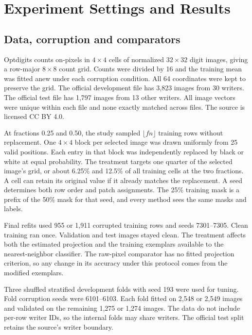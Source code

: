 \section{Experiment Settings and Results}
\subsection{Data, corruption and comparators}

Optdigits \citep{uci1998} counts on-pixels in $4\times4$ cells of normalized $32\times32$ digit images, giving a row-major $8\times8$ count grid. Counts were divided by 16 and the training mean was fitted anew under each corruption condition. All 64 coordinates were kept to preserve the grid. The official development file has 3,823 images from 30 writers. The official test file has 1,797 images from 13 other writers. All image vectors were unique within each file and none exactly matched across files. The source is licensed CC BY 4.0.


At fractions 0.25 and 0.50, the study sampled $\lfloor fn\rfloor$ training rows without replacement. One $4\times4$ block per selected image was drawn uniformly from 25 valid positions. Each entry in that block was independently replaced by black or white at equal probability. The treatment targets one quarter of the selected image's grid, or about 6.25\% and 12.5\% of all training cells at the two fractions. A cell can retain its original value if it already matches the replacement. A seed determines both row order and patch assignments. The 25\% training mask is a prefix of the 50\% mask for that seed, and every method sees the same masks and labels.

Final refits used 955 or 1,911 corrupted training rows and seeds 7301--7305. Clean training ran once. Validation and test images stayed clean. The treatment affects both the estimated projection and the training exemplars available to the nearest-neighbor classifier. The raw-pixel comparator has no fitted projection criterion, so any change in its accuracy under this protocol comes from the modified exemplars.

Three shuffled stratified development folds with seed 193 were used for tuning. Fold corruption seeds were 6101--6103. Each fold fitted on 2,548 or 2,549 images and validated on the remaining 1,275 or 1,274 images. The data do not include per-row writer IDs, so the internal folds may share writers. The official test split retains the source's writer boundary.

